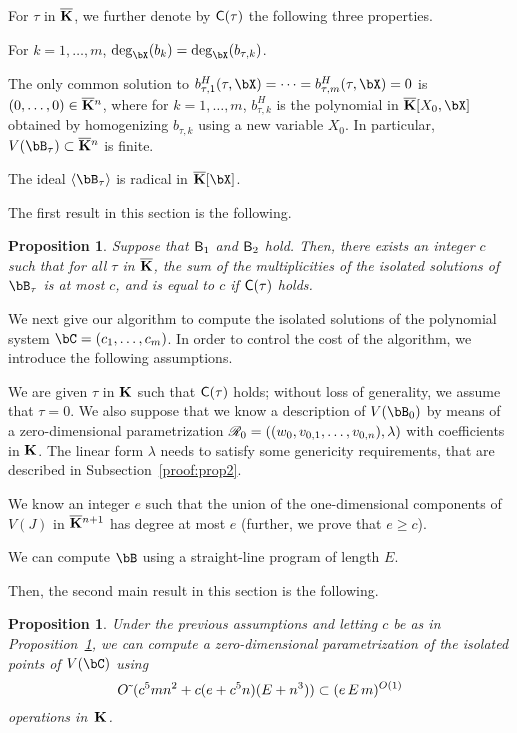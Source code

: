 \documentclass[12pt]{article}
\newtheorem{proposition}[definition]{Proposition}
\begin{document}
For $\tau$ in $\overline{\mathbf{K}}$, we further denote by $\mathsf{C}(\tau)$ the
following three properties.
\begin{description}[leftmargin=*]
\item[$\assG_1(\tau).$] For $k=1,\dots,m$,
  $\deg_\bX(b_k)=\deg_\bX(b_{\tau,k})$.
\item[$\assG_2(\tau).$] The only common solution to
  $b_{\tau,1}^H(\tau,\bX)=\cdots=b_{\tau,m}^H(\tau,\bX)=0$ is
  $(0,\dots,0)\in\overline{\mathbf{K}}{}^n$, where for $k=1,\dots,m$, $b_{\tau,k}^H$ is
  the polynomial in $\KKbar[X_0,\bX]$ obtained by homogenizing
  $b_{\tau,k}$ using a new variable $X_0$. In particular, $V(\bB_\tau)
  \subset \KKbar{}^n$ is finite.
\item[$\assG_3(\tau).$] The ideal $\langle \bB_\tau \rangle$ is
  radical in $\KKbar[\bX]$.
\end{description}

The first result in this section is the following.
\begin{proposition}\label{prop:degree_fiber}
  Suppose that $\mathsf{B}_1$ and $\mathsf{B}_2$ hold. Then, there exists an
  integer $c$ such that for all $\tau$ in $\overline{\mathbf{K}}$, the sum of the
  multiplicities of the isolated solutions of $\bB_\tau$ is at most
  $c$, and is equal to $c$ if $\mathsf{C}(\tau)$ holds.
\end{proposition}


We next give our algorithm to compute the isolated solutions of the
polynomial system $\bC=(c_1,\dots,c_m)$. In order to control the cost
of the algorithm, we introduce the following assumptions.
\begin{description}[leftmargin=*]
\item[${\assD}_1$.] We are given $\tau$ in $\mathbf{K}$ such that $\mathsf{C}(\tau)$
  holds; without loss of generality, we assume that $\tau=0$. We also
  suppose that we know a description of $V(\bB_{0})$ by means of a
  zero-dimensional parametrization  $\mathscr{R}_0 =((w_{0},v_{0,1},\dots,v_{0,n}),\lambda)$ with
  coefficients in $\mathbf{K}$. The linear form $\lambda$ needs to satisfy
  some genericity requirements, that are described in
  Subsection~\ref{proof:prop2}.
\item[${\assD}_2$.] We know an integer $e$ such that the union of the
  one-dimensional components of $V(J)$ in $\overline{\mathbf{K}}{}^{n+1}$ has degree
  at most $e$ (further, we prove that $e \ge c$).
\item[${\assD}_3$.] We can compute $\bB$ using a straight-line program
  of length $E$.
\end{description}
Then, the second main result in this section is the following.
\begin{proposition}\label{prop:compute_isolated}
  Under the previous assumptions and letting $c$ be as in
  Proposition~\ref{prop:degree_fiber}, we can compute a
  zero-dimensional parametrization of the isolated points of $V(\bC)$
  using
$${O}{\,\tilde{ }\,}(c^5 m n^2  + c(e+c^5 n)(E + n^3)) \subset (e\,E\,m)^{O(1)}$$ operations in~$\mathbf{K}$.
\end{proposition}
\end{document}
